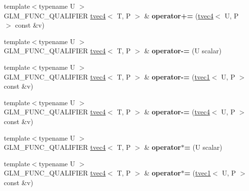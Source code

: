 \begin{DoxyCompactItemize}
\item 
\mbox{\label{structglm_1_1tvec4_a7f4b03466df6bcba831d4cfac6df8405}} 
{\footnotesize template$<$typename U $>$ }\\G\+L\+M\+\_\+\+F\+U\+N\+C\+\_\+\+Q\+U\+A\+L\+I\+F\+I\+ER \hyperlink{structglm_1_1tvec4}{tvec4}$<$ T, P $>$ \& {\bfseries operator+=} (\hyperlink{structglm_1_1tvec4}{tvec4}$<$ U, P $>$ const \&v)
\item 
\mbox{\label{structglm_1_1tvec4_aa293b1a9e9bfc9d9a3700a821a39cc23}} 
{\footnotesize template$<$typename U $>$ }\\G\+L\+M\+\_\+\+F\+U\+N\+C\+\_\+\+Q\+U\+A\+L\+I\+F\+I\+ER \hyperlink{structglm_1_1tvec4}{tvec4}$<$ T, P $>$ \& {\bfseries operator-\/=} (U scalar)
\item 
\mbox{\label{structglm_1_1tvec4_a1cb06bb90bd33c7cf2c8a2a97484af56}} 
{\footnotesize template$<$typename U $>$ }\\G\+L\+M\+\_\+\+F\+U\+N\+C\+\_\+\+Q\+U\+A\+L\+I\+F\+I\+ER \hyperlink{structglm_1_1tvec4}{tvec4}$<$ T, P $>$ \& {\bfseries operator-\/=} (\hyperlink{structglm_1_1tvec1}{tvec1}$<$ U, P $>$ const \&v)
\item 
\mbox{\label{structglm_1_1tvec4_a75d65a025aeea5e7351d8c0113fabebb}} 
{\footnotesize template$<$typename U $>$ }\\G\+L\+M\+\_\+\+F\+U\+N\+C\+\_\+\+Q\+U\+A\+L\+I\+F\+I\+ER \hyperlink{structglm_1_1tvec4}{tvec4}$<$ T, P $>$ \& {\bfseries operator-\/=} (\hyperlink{structglm_1_1tvec4}{tvec4}$<$ U, P $>$ const \&v)
\item 
\mbox{\label{structglm_1_1tvec4_a4f3f80916be24468c51c739e75cc1c68}} 
{\footnotesize template$<$typename U $>$ }\\G\+L\+M\+\_\+\+F\+U\+N\+C\+\_\+\+Q\+U\+A\+L\+I\+F\+I\+ER \hyperlink{structglm_1_1tvec4}{tvec4}$<$ T, P $>$ \& {\bfseries operator$\ast$=} (U scalar)
\item 
\mbox{\label{structglm_1_1tvec4_ab88c27f3115f0fa7593fccf3d896779b}} 
{\footnotesize template$<$typename U $>$ }\\G\+L\+M\+\_\+\+F\+U\+N\+C\+\_\+\+Q\+U\+A\+L\+I\+F\+I\+ER \hyperlink{structglm_1_1tvec4}{tvec4}$<$ T, P $>$ \& {\bfseries operator$\ast$=} (\hyperlink{structglm_1_1tvec1}{tvec1}$<$ U, P $>$ const \&v)

\end{DoxyCompactItemize}
